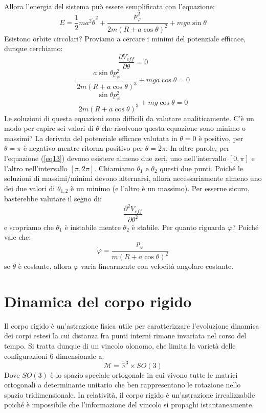 \documentclass[a4paper,openany]{article}
\begin{document}
	Allora l'energia del sistema può essere semplificata con l'equazione:
	$$
	E = \dfrac{1}{2}ma^2\dot{\theta}^{2} + \dfrac{p_{\varphi}^{2}}{2m(R+a\cos\theta)^2} + mga\sin\theta
	$$
	Esistono orbite circolari? Proviamo a cercare i minimi del potenziale efficace, dunque cerchiamo:
	$$
	\dfrac{\partial V_{eff}}{\partial \theta} = 0
	$$
	$$
	\dfrac{a\sin\theta p_{\varphi}^{2}}{2m(R+a\cos\theta)^3} + mga\cos\theta = 0
	$$
	\begin{equation}
		\dfrac{\sin\theta p_{\varphi}^{2}}{2m(R+a\cos\theta)^3} + mg\cos\theta = 0
		\label{eq13}
	\end{equation}
	Le soluzioni di questa equazioni sono difficili da valutare analiticamente. C'è un modo per capire sei valori di $\theta$ che risolvono questa equazione sono minimo o massimi? La derivata del potenziale efficace valutata in $\theta=0$ è positivo, per $\theta = \pi$ è negativo mentre ritorna positivo per $\theta = 2\pi$. In altre parole, per l'equazione (\ref{eq13}) devono esistere almeno due zeri, uno nell'intervallo $[0,\pi]$ e l'altro nell'intervallo $[\pi, 2\pi]$. Chiamiamo $\theta_1$ e $\theta_2$ questi due punti. Poiché le soluzioni di massimi/minimi devono alternarsi, allora necessariamente almeno uno dei due valori di $\theta_{1,2}$ è un minimo (e l'altro è un massimo). Per esserne sicuro, basterebbe valutare il segno di:
	$$
	\dfrac{\partial^{2}V_{eff}}{\partial \theta^{2}}
	$$
	e scopriamo che $\theta_1$ è instabile mentre $\theta_2$ è stabile. Per quanto riguarda $\varphi$? Poiché vale che:
	$$
	\dot{\varphi} = \dfrac{p_{\varphi}}{m(R+a\cos\theta)^2}
	$$
	se $\theta$ è costante, allora $\varphi$ varia linearmente con velocità angolare costante.
	\newpage
	
	\section{Dinamica del corpo rigido}
	Il corpo rigido è un'astrazione fisica utile per caratterizzare l'evoluzione dinamica dei corpi estesi la cui distanza fra punti interni rimane invariata nel corso del tempo. Si tratta dunque di un vincolo olonomo, che limita la varietà delle configurazioni 6-dimensionale a:
	$$
	\mathcal{M} = \mathbb{R}^{3}\times SO(3)
	$$
	Dove $SO(3)$ è lo spazio speciale ortogonale in cui vivono tutte le matrici ortogonali a determinante unitario che ben rappresentano le rotazione nello spazio tridimensionale.  In relatività, il corpo rigido è un'astrazione irrealizzabile poiché è impossibile che l'informazione del vincolo si propaghi istantaneamente. 
	
\end{document}
